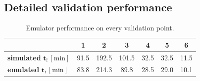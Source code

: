 \subsection{Detailed validation performance}
\begin{table}[H]
  \centering
  \caption{Emulator performance on every validation point.}
  \label{tab:validation_performance}
  \begin{tabular}{lcccccc}
    \toprule
     & \textbf{1} & \textbf{2} & \textbf{3} & \textbf{4} & \textbf{5} & \textbf{6}\\
    \midrule
    \textbf{simulated} $\bm{t_!}\,[\si{\minute}]$ & 91.5 & 192.5 & 101.5 & 32.5 & 32.5 & 11.5\\
    \textbf{emulated}  $\bm{t_!}\,[\si{\minute}]$ & 83.8 & 214.3 & 89.8  & 28.5 & 29.0 & 10.1\\
    \bottomrule
  \end{tabular}
\end{table}
